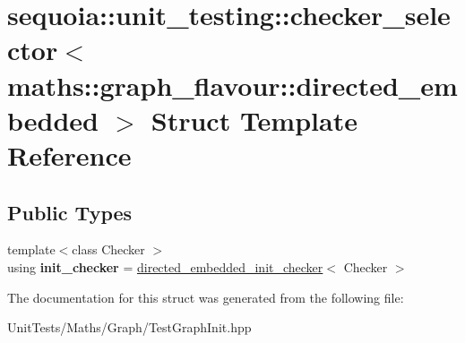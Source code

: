 \hypertarget{structsequoia_1_1unit__testing_1_1checker__selector_3_01maths_1_1graph__flavour_1_1directed__embedded_01_4}{}\section{sequoia\+::unit\+\_\+testing\+::checker\+\_\+selector$<$ maths\+::graph\+\_\+flavour\+::directed\+\_\+embedded $>$ Struct Template Reference}
\label{structsequoia_1_1unit__testing_1_1checker__selector_3_01maths_1_1graph__flavour_1_1directed__embedded_01_4}
\subsection*{Public Types}
\begin{DoxyCompactItemize}
\item 
\mbox{\label{structsequoia_1_1unit__testing_1_1checker__selector_3_01maths_1_1graph__flavour_1_1directed__embedded_01_4_af555338311e68ce8c11bb38a2fd77d0d}} 
{\footnotesize template$<$class Checker $>$ }\\using {\bfseries init\+\_\+checker} = \mbox{\hyperlink{classsequoia_1_1unit__testing_1_1directed__embedded__init__checker}{directed\+\_\+embedded\+\_\+init\+\_\+checker}}$<$ Checker $>$
\end{DoxyCompactItemize}


The documentation for this struct was generated from the following file\+:\begin{DoxyCompactItemize}
\item 
Unit\+Tests/\+Maths/\+Graph/Test\+Graph\+Init.\+hpp\end{DoxyCompactItemize}
